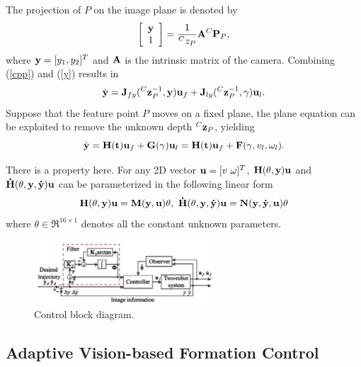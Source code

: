 \documentclass[12pt,a4paper]{article}
\begin{document}
The projection of $P$ on the image plane is denoted by
\begin{equation}
\left[
    \begin{array}{c}
    {\bf y}\\
    1
    \end{array}
\right]
=\frac{1}{{}^Cz_P}{\bf A}{}^C{\bf P}_P,
\label{y}
\end{equation}
where ${\bf y}=[y_1,y_2]^T$ and ${\bf A}$ is the intrinsic matrix of the camera. Combining (\ref{cpp}) and (\ref{y}) results in
\begin{equation}
\dot{\bf y}={\bf J}_{fy}({}^C{\bf z}_P^{-1},{\bf y}){\bf u}_f+{\bf J}_{ly}({}^C{\bf z}_P^{-1},\gamma){\bf u}_l.
\end{equation}
Suppose that the feature point $P$ moves on a fixed plane, the plane equation can be exploited to remove the unknown depth ${}^C{\bf z}_P$, yielding
\begin{equation}
\dot{\bf y}={\bf H}({\bf t}){\bf u}_f+{\bf G}(\gamma){\bf u}_l={\bf H}({\bf t}){\bf u}_f+{\bf F}(\gamma,v_l,\omega_l).
\label{doty}
\end{equation}

\indent There is a property here. For any 2D vector ${\bf u}=[v\ \omega]^T$, ${\bf H}(\theta, {\bf y}){\bf u}$ and ${\bf \dot H}(\theta, {\bf y, \dot y}){\bf u}$ can be parameterized in the following linear form
\begin{equation}
{\bf H}(\theta,{\bf y}){\bf u}={\bf M(y,u)}\theta,\ 
{\bf \dot H}(\theta,{\bf y, \dot y}){\bf u}={\bf N(y,\dot y ,u)}\theta
\end{equation}
where $\theta \in {\mathfrak R}^{16\times1}$ denotes all the constant unknown parameters.

\begin{figure}
  \centering
  \includegraphics[width=0.6\textwidth]{figs/control.jpg}%
  \caption{Control block diagram.}
  \label{control}
\end{figure}


\subsection{Adaptive Vision-based Formation Control}
\end{document}

